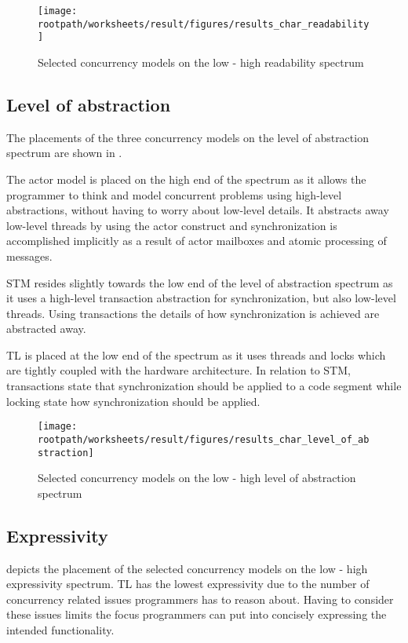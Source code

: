 \begin{figure}[htbp]
\centering
 \texttt{[image: \\rootpath/worksheets/result/figures/results\_char\_readability]} 
 \caption{Selected concurrency models on the low - high readability spectrum}
\label{fig:results_char_readability}
\end{figure}

\subsection{Level of abstraction}
The placements of the three concurrency models on the level of abstraction spectrum are shown in .

The actor model is placed on the high end of the spectrum as it allows the programmer to think and model concurrent problems using high-level abstractions, without having to worry about low-level details. It abstracts away low-level threads by using the actor construct and synchronization is accomplished implicitly as a result of actor mailboxes and atomic processing of messages.

\ac{STM} resides slightly towards the low end of the level of abstraction spectrum as it uses a high-level transaction abstraction for synchronization, but also low-level threads. Using transactions the details of how synchronization is achieved are abstracted away. 

\ac{TL} is placed at the low end of the spectrum as it uses threads and locks which are tightly coupled with the hardware architecture. In relation to \ac{STM}, transactions state that synchronization should be applied to a code segment while locking state how synchronization should be applied.

\begin{figure}[htbp]
\centering
 \texttt{[image: \\rootpath/worksheets/result/figures/results\_char\_level\_of\_abstraction]} 
 \caption{Selected concurrency models on the low - high level of abstraction spectrum}
\label{fig:results_char_level_of_abstraction}
\end{figure}

\subsection{Expressivity}
 depicts the placement of the selected concurrency models on the low - high expressivity spectrum. \ac{TL} has the lowest expressivity due to the number of concurrency related issues programmers has to reason about. Having to consider these issues limits the focus programmers can put into concisely expressing the intended functionality.

